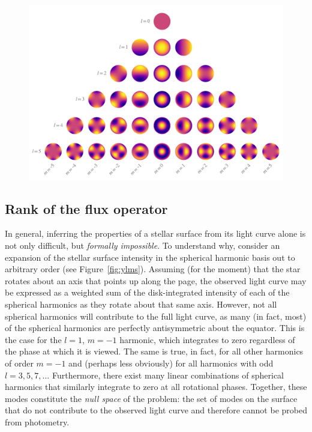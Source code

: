 \documentclass[modern]{aastex62}
\begin{document}
\begin{figure}[t!]
    \begin{centering}
        \includegraphics[width=\linewidth]{figures/ylms.pdf}
    \end{centering}
\end{figure}

\subsection{Rank of the flux operator}
%
In general, inferring the properties of a stellar surface from its light curve alone
is not
only difficult, but \emph{formally impossible}. To understand why, consider
an expansion of the stellar surface intensity in the spherical
harmonic basis out to arbitrary order (see Figure~\ref{fig:ylms}).
Assuming (for the moment) that the
star rotates about an axis that points up along the page, the observed
light curve may be expressed as a weighted sum of the disk-integrated intensity
of each of the spherical harmonics as they rotate about that same axis.
However, not all spherical harmonics will contribute to the full light curve,
as many (in fact, most) of the spherical harmonics are perfectly antisymmetric
about the equator. This is the case for
the $l = 1$, $m = -1$ harmonic, which integrates to zero regardless of
the phase at which it is viewed. The same is true, in fact, for all other harmonics
of order $m = -1$ and (perhaps less obviously) for all harmonics with odd
$l = 3, 5, 7, ...$ Furthermore, there exist many linear combinations of
spherical harmonics that similarly integrate to zero at all rotational
phases. Together, these modes constitute the \emph{null space} of the problem:
the set of modes on the surface that do not contribute to the observed
light curve and therefore cannot be probed from photometry.
\end{document}
